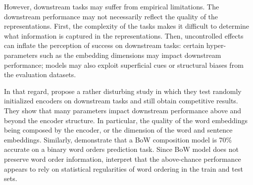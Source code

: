 However, downstream tasks may suffer from empirical limitations. The downstream performance may not necessarily reflect the quality of the representations. First, the complexity of the tasks makes it difficult to determine what information is captured in the representations. Then, uncontrolled effects can inflate the perception of success on downstream tasks: certain hyper-parameters such as the embedding dimensions may impact downstream performance; models may also exploit superficial cues or structural biases from the evaluation datasets.

In that regard, \textcite{wieting_19} propose a rather disturbing study in which they test randomly initialized encoders on downstream tasks and still obtain competitive results. They show that many parameters impact downstream performance above and beyond the encoder structure. In particular, the quality of the word embeddings being composed by the encoder, or the dimension of the word and sentence embeddings. Similarly, \textcite{adi_17} demonstrate that a BoW composition model is 70\% accurate on a binary word orders prediction task. Since BoW model does not preserve word order information, \textcite{ettinger_18} interpret that the above-chance performance appears to rely on statistical regularities of word ordering in the train and test sets.


